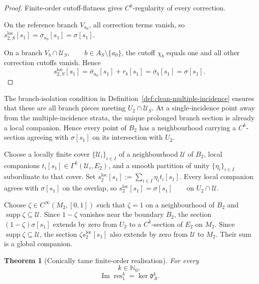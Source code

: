 \documentclass[11pt]{article}
\theoremstyle{plain}
\newtheorem{theorem}{Theorem}[section]
\theoremstyle{definition}
\begin{document}
\begin{proof}
Finite-order cutoff-flatness gives \(C^k\)-regularity of every
correction.

On the reference branch \(V_{a_0}\), all correction terms vanish, so
\(s_{2,S}^{\mathrm{loc}}[s_1] = \overline{\sigma}_{a_0}[s_1] = \sigma[s_1]\).

On a branch
\(V_b\cap\mathcal U_S, \qquad b\in A_S\setminus\{a_0\}\),
the cutoff \(\chi_b\) equals one and all other correction cutoffs
vanish. Hence
\[
  s_{2,S}^{\mathrm{loc}}[s_1]
  =
  \overline{\sigma}_{a_0}[s_1]
  +
  r_b[s_1]
  =
  \overline{\sigma}_b[s_1]
  =
  \sigma[s_1].
\]
\end{proof}

The branch-isolation condition in
Definition~\ref{def:clean-multiple-incidence}
ensures that these are all branch pieces meeting
\(U_2\cap\mathcal U_S\). At a single-incidence point away from the
multiple-incidence strata, the unique prolonged branch section is
already a local companion. Hence every point of \(B_2\) has a
neighbourhood carrying a \(C^k\)-section agreeing with
\(\sigma[s_1]\) on its intersection with \(U_2\).

Choose a locally finite cover \(\{\mathcal U_i\}_{i\in I}\) of a neighbourhood \(\mathcal U\) of \(B_2\), local companions
\(t_i[s_1]\in\Gamma^k(\mathcal U_i,E_2)\),
and a smooth partition of unity \(\{\eta_i\}_{i\in I}\) subordinate to that cover. Set
\(s_2^{\mathrm{loc}}[s_1] := \sum_{i\in I}\eta_i t_i[s_1]\).
Every local companion agrees with \(\sigma[s_1]\) on the overlap, so
\(s_2^{\mathrm{loc}}[s_1] = \sigma[s_1] \qquad \text{on }U_2\cap\mathcal U\).

Choose \(\zeta\in C^\infty(M_2,[0,1])\) such that \(\zeta=1\) on a neighbourhood of \(B_2\) and
\(\operatorname{supp}\zeta\subseteq\mathcal U\).
Since \(1-\zeta\) vanishes near the boundary \(B_2\), the section \((1-\zeta)\sigma[s_1]\) extends by zero from \(U_2\) to a \(C^k\)-section of \(E_2\) on
\(M_2\). Since \(\operatorname{supp}\zeta\subseteq\mathcal U\), the
section \(\zeta s_2^{\mathrm{loc}}[s_1]\) also extends by zero from \(\mathcal U\) to \(M_2\). Their sum is a
global companion.

\begin{theorem}[Conically tame finite-order realisation]
\label{thm:conically-tame-finite-realisation}
For every
\[
  k\in\mathbb N_0,
\]
\[
  \boxed{
  \operatorname{Im}\operatorname{res}_1^k
  =
  \ker\mathfrak d_A^k.
  }
\]
\end{theorem}
\end{document}
